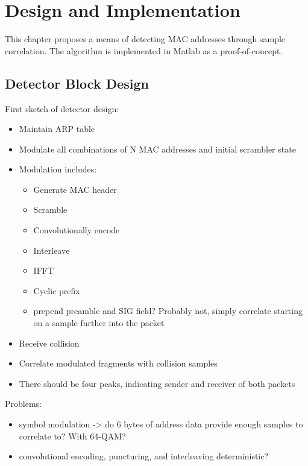 
\chapter{Design and Implementation}\label{ch:design}
\glsresetall %

This chapter proposes a means of detecting MAC addresses through sample correlation. The algorithm is implemented in Matlab as a proof-of-concept.



\section{Detector Block Design}

First sketch of detector design:

\begin{itemize}
	\item Maintain ARP table
	\item Modulate all combinations of N MAC addresses and initial scrambler state
	\item Modulation includes:
	\begin{itemize}
		\item Generate MAC header
		\item Scramble
		\item Convolutionally encode
		\item Interleave
		\item IFFT
		\item Cyclic prefix
		\item prepend preamble and SIG field? Probably not, simply correlate starting on a sample further into the packet
	\end{itemize}
	\item Receive collision
	\item Correlate modulated fragments with collision samples
	\item There should be four peaks, indicating sender and receiver of both packets
\end{itemize}

Problems:

\begin{itemize}
	\item symbol modulation -> do 6 bytes of address data provide enough samples to correlate to? With 64-QAM?
	\item convolutional encoding, puncturing, and interleaving deterministic?
\end{itemize}

